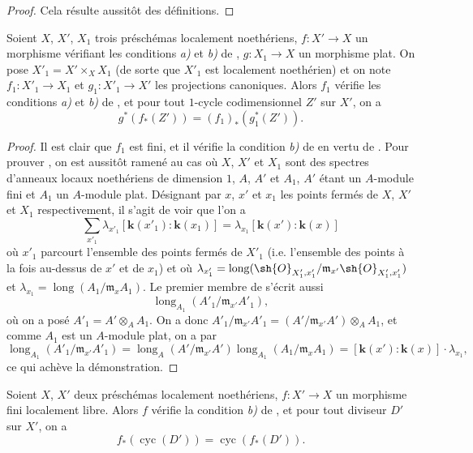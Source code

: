 \begin{proof}
Cela résulte aussitôt des définitions.
\end{proof}

\begin{proposition}[21.10.16]
\label{IV.21.10.16}
Soient $X$, $X'$, $X_1$ trois préschémas localement noethériens, $f:X'\to X$ un morphisme vérifiant les conditions \emph{a)} et \emph{b)} de , $g:X_1\to X$ un morphisme plat.
On pose $X'_1=X'\times_XX_1$ (de sorte que $X'_1$ est localement noethérien) et on note $f_1:X'_1\to X_1$ et $g_1:X'_1\to X'$ les projections canoniques.
Alors $f_1$ vérifie les conditions \emph{a)} et \emph{b)} de , et pour tout $1$-cycle codimensionnel $Z'$ sur $X'$, on a
\[
\label{IV.21.10.16.1}
  g^*(f_*(Z'))=(f_1)_*(g_1^*(Z')).
  \tag{21.10.16.1}
\]
\end{proposition}

\begin{proof}
Il est clair que $f_1$ est fini, et il vérifie la condition \emph{b)} de  en vertu de .
Pour prouver , on est aussitôt ramené au cas où $X$, $X'$ et $X_1$ sont des spectres d'anneaux locaux noethériens de dimension $1$, $A$, $A'$ et $A_1$, $A'$ étant un $A$-module fini et $A_1$ un $A$-module plat.
Désignant par $x$, $x'$ et $x_1$ les points fermés de $X$, $X'$ et $X_1$ respectivement, il s'agit de voir que l'on a
\[
\label{IV.21.10.16.2}
  \sum_{x'_1}\lambda_{x'_1}[\boldsymbol{k}(x'_1):\boldsymbol{k}(x_1)]
  =\lambda_{x_1}[\boldsymbol{k}(x'):\boldsymbol{k}(x)]
  \tag{21.10.16.2}
\]
où $x'_1$ parcourt l'ensemble des points fermés de $X'_1$ (i.e. l'ensemble des points à la fois au-dessus de $x'$ et de $x_1$) et où $\lambda_{x'_1}=\operatorname{long}(\sh{O}_{X'_1,x'_1}/\mathfrak{m}_{x'}\sh{O}_{X'_1,x'_1})$ et $\lambda_{x_1}=\operatorname{long}(A_1/\mathfrak{m}_xA_1)$.
Le premier membre de  s'écrit aussi
\[
  \operatorname{long}_{A_1}(A'_1/\mathfrak{m}_{x'}A'_1),
\]
où on a posé $A'_1=A'\otimes_AA_1$.
On a donc $A'_1/\mathfrak{m}_{x'}A'_1=(A'/\mathfrak{m}_{x'}A')\otimes_AA_1$, et comme $A_1$ est un $A$-module plat, on a par 
\[
  \operatorname{long}_{A_1}(A'_1/\mathfrak{m}_{x'}A'_1)
  =\operatorname{long}_{A}(A'/\mathfrak{m}_{x'}A')\operatorname{long}_{A_1}(A_1/\mathfrak{m}_xA_1)
  =[\boldsymbol{k}(x'): \boldsymbol{k}(x)]\cdot\lambda_{x_1},
\]
ce qui achève la démonstration.
\end{proof}

\begin{proposition}[21.10.17]
\label{IV.21.10.17}
Soient $X$, $X'$ deux préschémas localement noethériens, $f:X'\to X$ un morphisme fini localement libre.
Alors $f$ vérifie la condition \emph{b)} de , et pour tout diviseur $D'$ sur $X'$, on a
\[
\label{IV.21.10.17.1}
  f_*(\operatorname{cyc}(D'))=\operatorname{cyc}(f_*(D')).
  \tag{21.10.17.1}
\]
\end{proposition}

